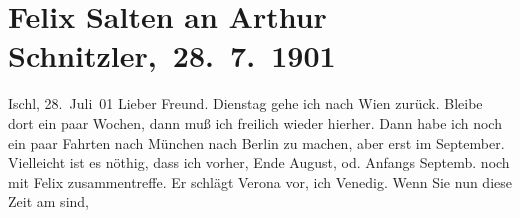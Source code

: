 

         
         \renewcommand{\erwaehntePersonen}{Personen: Friedrich von Bodenstedt, Hugo Felix, Felix Salten, Mirzä Şäfi Vazeh, Josef Willomitzer, Bogumil Zepler}
         \renewcommand{\erwaehnteOrte}{Orte: Bad Ischl, Berlin, Feldkirch, Jung-Wiener Theater zum Lieben Augustin, Lago di Garda, München, St. Anton am Arlberg, Vahrn, Venedig, Verona, Wien}
         \renewcommand{\erwaehnteWerke}{Werke: Der einsame Weg. Schauspiel in fünf Akten, Die Gedenktafel der Prinzessin Anna, Die Insel. Monatsschrift mit Buchschmuck und Illustrationen, Hafisa, Neue Loreley}
               \section[ Felix Salten an Arthur Schnitzler, 28. 7. 1901]{ Felix Salten an Arthur Schnitzler, 28. 7. 1901}\nopagebreak{}\rehead{ }\begin{ledgroupsized}[t]{13cm}\normalsize\beginnumbering{} \toendnotes[C]{\smallbreak\pagebreak[2]} 
\toendnotes[C]{\smallbreak}\pstart
           \raggedleft{}{\pb}Ischl, 28. Juli 01\pend
           \pstart
           Lieber Freund.{ }Dienstag gehe ich nach Wien zurück. Bleibe dort ein paar Wochen, dann muß ich freilich wieder
               hierher. Dann habe ich noch ein paar Fahrten nach München nach Berlin zu
               machen, aber erst im September. Vielleicht ist es nöthig,
               dass ich vorher, Ende August, od. Anfangs Septemb. noch mit Felix zusammentreffe. Er schlägt Verona vor, ich Venedig.
               Wenn Sie nun diese Zeit am \label{K_L03316-1v}\label{K_L03316-1h} sind,

\end{ledgroupsized}
